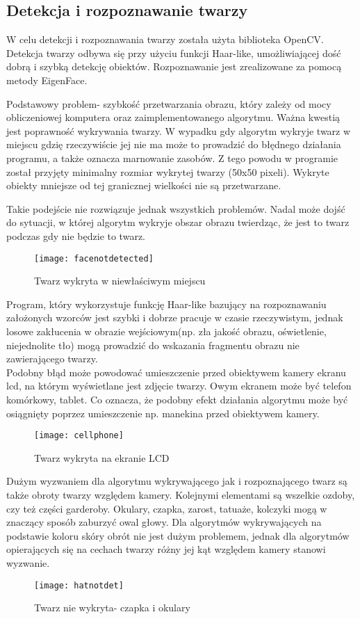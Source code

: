 \documentclass[eng,printmode]{mgr}
\begin{document}
\subsection{Detekcja i rozpoznawanie twarzy}

W celu detekcji i rozpoznawania twarzy została użyta biblioteka OpenCV. Detekcja twarzy odbywa się przy użyciu funkcji Haar-like, umożliwiającej dość dobrą i szybką detekcję obiektów. Rozpoznawanie jest zrealizowane za pomocą metody EigenFace.

Podstawowy problem- szybkość przetwarzania obrazu, który zależy od mocy obliczeniowej komputera oraz zaimplementowanego algorytmu. Ważna kwestią jest poprawność wykrywania twarzy. W wypadku gdy algorytm wykryje twarz w miejscu gdzię rzeczywiście jej nie ma może to prowadzić do błędnego działania programu, a także oznacza marnowanie zasobów. Z tego powodu w programie został przyjęty minimalny rozmiar wykrytej twarzy (50x50 pixeli). Wykryte obiekty mniejsze od tej granicznej wielkości nie są przetwarzane.

Takie podejście nie rozwiązuje jednak wszystkich problemów. Nadal może dojść do sytuacji, w której algorytm wykryje obszar obrazu twierdząc, że jest to twarz podczas gdy nie będzie to twarz.\\
\begin{figure}[placement h]
\texttt{[image: facenotdetected]}
\caption{Twarz wykryta w niewłaściwym miejscu}
\end{figure}

Program, który wykorzystuje funkcję Haar-like bazujący na rozpoznawaniu założonych wzorców jest szybki i dobrze pracuje w czasie rzeczywistym, jednak losowe zakłucenia w obrazie wejściowym(np. zła jakość obrazu, oświetlenie, niejednolite tło) mogą prowadzić do wskazania fragmentu obrazu nie zawierającego twarzy.\\

Podobny błąd może powodować umieszczenie przed obiektywem kamery ekranu lcd, na którym wyświetlane jest zdjęcie twarzy. Owym ekranem może być telefon komórkowy, tablet. Co oznacza, że podobny efekt działania algorytmu może być osiągnięty poprzez umieszczenie np. manekina przed obiektywem kamery.\\
\begin{figure}[placement h]
\texttt{[image: cellphone]}
\caption{Twarz wykryta na ekranie LCD}
\end{figure}

Dużym wyzwaniem dla algorytmu wykrywającego jak i rozpoznającego twarz są także obroty twarzy względem kamery. Kolejnymi elementami są wszelkie ozdoby, czy też części garderoby. Okulary, czapka, zarost, tatuaże, kolczyki mogą w znaczący sposób zaburzyć owal głowy. Dla algorytmów wykrywających na podstawie koloru skóry obrót nie jest dużym problemem, jednak dla algorytmów opierających się na cechach twarzy różny jej kąt względem kamery stanowi wyzwanie.\\
\begin{figure}[placement h]
\texttt{[image: hatnotdet]}
\caption{Twarz nie wykryta- czapka i okulary}
\end{figure}
\end{document}
